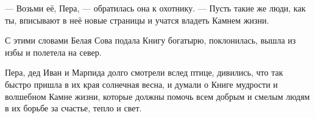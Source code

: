 \documentclass[oneside,final,14pt]{extreport}
\begin{document}
	— Возьми её, Пера, — обратилась она к охотнику. — Пусть такие же люди, как ты, вписывают в неё новые страницы и учатся владеть Камнем жизни.
	
	С этими словами Белая Сова подала Книгу богатырю, поклонилась, вышла из избы и полетела на север.
	
	Пера, дед Иван и Марпида долго смотрели вслед птице, дивились, что так быстро пришла в их края солнечная весна, и думали о Книге мудрости и волшебном Камне жизни, которые должны помочь всем добрым и смелым людям в их борьбе за счастье, тепло и свет.
	
	\newpage
	\tableofcontents
	
	\thispagestyle{empty} %
	
	\newpage
	
	\setcounter{secnumdepth}{0}  
	
	
\end{document}
